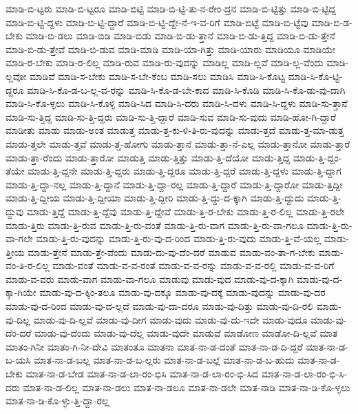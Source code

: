{ಮಾಡಿ-ಬಿ-ಟ್ಟರು
ಮಾಡಿ-ಬಿ-ಟ್ಟರೂ
ಮಾಡಿ-ಬಿಟ್ಟಿ
ಮಾಡಿ-ಬಿ-ಟ್ಟಿ-ತು-ನ-ರೇಂ-ದ್ರನ
ಮಾಡಿ-ಬಿ-ಟ್ಟಿತ್ತು
ಮಾಡಿ-ಬಿ-ಟ್ಟಿದ್ದ
ಮಾಡಿ-ಬಿ-ಟ್ಟಿ-ದ್ದಳು
ಮಾಡಿ-ಬಿ-ಟ್ಟಿ-ದ್ದಾರೆ
ಮಾಡಿ-ಬಿ-ಟ್ಟಿ-ದ್ದೇ-ನೆ-ಇ-ವ-ರಿಗೆ
ಮಾಡಿ-ಬಿಟ್ಟೆ
ಮಾಡಿ-ಬಿ-ಟ್ಟೆವು
ಮಾಡಿ-ಬಿ-ಡ-ಬೇಕು
ಮಾಡಿ-ಬಿ-ಡಲು
ಮಾಡಿ-ಬಿಡಿ
ಮಾಡಿ-ಬಿಡು
ಮಾಡಿ-ಬಿ-ಡು-ತ್ತಾನೆ
ಮಾಡಿ-ಬಿ-ಡು-ತ್ತಿದ್ದ
ಮಾಡಿ-ಬಿ-ಡು-ತ್ತೇನೆ
ಮಾಡಿ-ಬಿ-ಡು-ತ್ತೇವೆ
ಮಾಡಿ-ಬಿ-ಡುವ
ಮಾಡಿ-ಮಾಡಿ
ಮಾಡಿ-ಯಾ-ಗಿತ್ತು
ಮಾಡಿ-ಯಾರು
ಮಾಡಿಯೂ
ಮಾಡಿಯೇ
ಮಾಡಿ-ರ-ಬೇಕು
ಮಾಡಿ-ರ-ಲಿಲ್ಲ
ಮಾಡಿ-ರುವ
ಮಾಡಿ-ರು-ವುದನ್ನು
ಮಾಡಿಲ್ಲ
ಮಾಡಿ-ಲ್ಲವೆ
ಮಾಡಿ-ಲ್ಲ-ವೆಂದು
ಮಾಡಿ-ಲ್ಲವೋ
ಮಾಡಿವೆ
ಮಾಡಿ-ಸ-ಬೇಕು
ಮಾಡಿ-ಸ-ಬೇ-ಕೆಂಬ
ಮಾಡಿ-ಸಲು
ಮಾಡಿಸಿ
ಮಾಡಿ-ಸಿ-ಕೊಟ್ಟ
ಮಾಡಿ-ಸಿ-ಕೊ-ಟ್ಟಿ-ದ್ದರೂ
ಮಾಡಿ-ಸಿ-ಕೊ-ಡ-ಬ-ಲ್ಲ-ವ-ರನ್ನು
ಮಾಡಿ-ಸಿ-ಕೊ-ಡ-ಬೇ-ಕಾದ
ಮಾಡಿ-ಸಿ-ಕೊಡಿ
ಮಾಡಿ-ಸಿ-ಕೊ-ಡು-ವು-ದಾಗಿ
ಮಾಡಿ-ಸಿ-ಕೊ-ಳ್ಳಲು
ಮಾಡಿ-ಸಿ-ಕೊಳ್ಳಿ
ಮಾಡಿ-ಸಿದ
ಮಾಡಿ-ಸಿ-ದರು
ಮಾಡಿ-ಸಿ-ದಳು
ಮಾಡಿ-ಸಿ-ದ್ದಳು
ಮಾಡಿ-ಸು-ತ್ತಾನೆ
ಮಾಡಿ-ಸು-ತ್ತಿದ್ದ
ಮಾಡಿ-ಸು-ತ್ತಿ-ದ್ದರು
ಮಾಡಿ-ಸು-ತ್ತಿ-ದ್ದಾರೆ
ಮಾಡಿ-ಸುವ
ಮಾಡಿ-ಸು-ವುದು
ಮಾಡಿ-ಹೋ-ಗಿ-ದ್ದಾರೆ
ಮಾಡೀತು
ಮಾಡು
ಮಾಡು-ಅಂತ
ಮಾಡುತ್ತ
ಮಾಡು-ತ್ತ-ಕು-ಳಿ-ತಿ-ರು-ವುದನ್ನು
ಮಾಡು-ತ್ತದೆ
ಮಾಡು-ತ್ತ-ಮಾ-ಡುತ್ತ
ಮಾಡು-ತ್ತಲೇ
ಮಾಡು-ತ್ತವೆ
ಮಾಡು-ತ್ತ-ಹೋಗು
ಮಾಡು-ತ್ತಾನೆ
ಮಾಡು-ತ್ತಾ-ನೆ-ಎಲ್ಲ
ಮಾಡು-ತ್ತಾನೋ
ಮಾಡು-ತ್ತಾರೆ
ಮಾಡು-ತ್ತಾ-ರೆಂದು
ಮಾಡು-ತ್ತಾರೋ
ಮಾಡುತ್ತಿ
ಮಾಡು-ತ್ತಿತ್ತು
ಮಾಡು-ತ್ತಿ-ದೆಯೋ
ಮಾಡು-ತ್ತಿದ್ದ
ಮಾಡು-ತ್ತಿ-ದ್ದಂ-ತೆಯೇ
ಮಾಡು-ತ್ತಿ-ದ್ದನೇ
ಮಾಡು-ತ್ತಿ-ದ್ದರು
ಮಾಡು-ತ್ತಿ-ದ್ದರೂ
ಮಾಡು-ತ್ತಿ-ದ್ದರೆ
ಮಾಡು-ತ್ತಿ-ದ್ದಳು
ಮಾಡು-ತ್ತಿ-ದ್ದಾಗ
ಮಾಡು-ತ್ತಿ-ದ್ದಾ-ನಲ್ಲ
ಮಾಡು-ತ್ತಿ-ದ್ದಾನೆ
ಮಾಡು-ತ್ತಿ-ದ್ದಾ-ರಲ್ಲ
ಮಾಡು-ತ್ತಿ-ದ್ದಾರೆ
ಮಾಡು-ತ್ತಿ-ದ್ದಾರೋ
ಮಾಡು-ತ್ತಿದ್ದೀ
ಮಾಡು-ತ್ತಿ-ದ್ದೀಯ
ಮಾಡು-ತ್ತಿ-ದ್ದೀಯಾ
ಮಾಡು-ತ್ತಿ-ದ್ದೀರಿ
ಮಾಡು-ತ್ತಿ-ದ್ದು-ದ-ಕ್ಕಾಗಿ
ಮಾಡು-ತ್ತಿ-ದ್ದುದು
ಮಾಡು-ತ್ತಿ-ದ್ದುವು
ಮಾಡು-ತ್ತಿದ್ದೆ
ಮಾಡು-ತ್ತಿ-ದ್ದೆವು
ಮಾಡು-ತ್ತಿ-ದ್ದೇವೆ
ಮಾಡು-ತ್ತಿ-ರ-ಬೇಕು
ಮಾಡು-ತ್ತಿ-ರ-ಲಿಲ್ಲ
ಮಾಡು-ತ್ತಿ-ರಲೇ
ಮಾಡು-ತ್ತಿರು
ಮಾಡು-ತ್ತಿ-ರುವ
ಮಾಡು-ತ್ತಿ-ರು-ವಂತೆ
ಮಾಡು-ತ್ತಿ-ರು-ವಾಗ
ಮಾಡು-ತ್ತಿ-ರು-ವಾ-ಗಲೂ
ಮಾಡು-ತ್ತಿ-ರು-ವಾ-ಗಲೇ
ಮಾಡು-ತ್ತಿ-ರು-ವುದನ್ನು
ಮಾಡು-ತ್ತಿ-ರು-ವು-ದ-ರಿಂದ
ಮಾಡು-ತ್ತಿ-ರು-ವುದು
ಮಾಡು-ತ್ತಿ-ವೆ-ಯಲ್ಲ
ಮಾಡು-ತ್ತೀಯ
ಮಾಡು-ತ್ತೇನೆ
ಮಾಡು-ತ್ತೇ-ವೆಂದು
ಮಾಡು-ದು-ವು-ದೆಂ-ದರೆ
ಮಾಡುವ
ಮಾಡು-ವಂ-ತಾ-ಗ-ಬೇಕು
ಮಾಡು-ವಂ-ತಿ-ರ-ಲಿಲ್ಲ
ಮಾಡು-ವಂತೆ
ಮಾಡು-ವ-ವ-ರಂತೆ
ಮಾಡು-ವ-ವ-ರನ್ನು
ಮಾಡು-ವ-ವ-ರಲ್ಲಿ
ಮಾಡು-ವ-ವ-ರಿಗೆ
ಮಾಡು-ವ-ವರು
ಮಾಡು-ವಾಗ
ಮಾಡು-ವಾ-ಗಲೂ
ಮಾಡುವು
ಮಾಡು-ವುದ
ಮಾಡು-ವು-ದ-ಕ್ಕಾಗಿ
ಮಾಡು-ವು-ದ-ಕ್ಕಾ-ಗಿಯೇ
ಮಾಡು-ವು-ದ-ಕ್ಕಿಂ-ತಲೂ
ಮಾಡು-ವು-ದಕ್ಕೂ
ಮಾಡು-ವು-ದಕ್ಕೆ
ಮಾಡು-ವುದನ್ನು
ಮಾಡು-ವು-ದರ
ಮಾಡು-ವು-ದ-ರಿಂದ
ಮಾಡು-ವು-ದ-ಲ್ಲದೆ
ಮಾಡು-ವು-ದಾ-ದರೂ
ಮಾಡು-ವು-ದಿತ್ತು
ಮಾಡು-ವು-ದಿ-ರಲಿ
ಮಾಡು-ವು-ದಿಲ್ಲ
ಮಾಡು-ವು-ದಿ-ಲ್ಲವೆ
ಮಾಡು-ವು-ದೀಗ
ಮಾಡು-ವುದು
ಮಾಡು-ವು-ದು-ಇದೇ
ಮಾಡು-ವುದೂ
ಮಾಡು-ವು-ದೆಂ-ದರೆ
ಮಾಡು-ವು-ದೆಂದು
ಮಾಡು-ವು-ದೆಲ್ಲ
ಮಾಡು-ವುದೇ
ಮಾಡುವೆ
ಮಾಡೋಣ
ಮಾಡೋ-ದಿ-ಲ್ಲವೆ
ಮಾತ
ಮಾತಂ-ಗಿನೀ
ಮಾತಂ-ಗಿ-ನೀ-ದೇವಿ
ಮಾತಂತೂ
ಮಾತನಾ
ಮಾತ-ನಾ-ಡ-ದಂತೆ
ಮಾತ-ನಾ-ಡ-ದಿ-ದ್ದರೆ
ಮಾತ-ನಾ-ಡ-ಬ-ಯಸಿ
ಮಾತ-ನಾ-ಡ-ಬಲ್ಲ
ಮಾತ-ನಾ-ಡ-ಬ-ಲ್ಲರು
ಮಾತ-ನಾ-ಡ-ಬಲ್ಲೆ
ಮಾತ-ನಾ-ಡ-ಬ-ಹುದು
ಮಾತ-ನಾ-ಡ-ಬೇಕು
ಮಾತ-ನಾ-ಡ-ಬೇಡ
ಮಾತ-ನಾ-ಡ-ಲಾ-ರಂ-ಭಿಸಿ
ಮಾತ-ನಾ-ಡ-ಲಾ-ರಂ-ಭಿ-ಸಿದ
ಮಾತ-ನಾ-ಡ-ಲಾ-ರಂ-ಭಿ-ಸಿ-ದರು
ಮಾತ-ನಾ-ಡ-ಲಿಲ್ಲ
ಮಾತ-ನಾ-ಡಲು
ಮಾತ-ನಾ-ಡಲೂ
ಮಾತ-ನಾ-ಡಲೇ
ಮಾತ-ನಾಡಿ
ಮಾತ-ನಾ-ಡಿ-ಕೊ-ಳ್ಳಲು
ಮಾತ-ನಾ-ಡಿ-ಕೊ-ಳ್ಳು-ತ್ತಿ-ದ್ದಾ-ರಲ್ಲ
}
